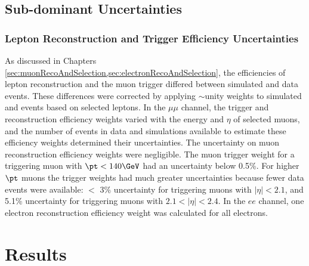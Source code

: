 \subsection{Sub-dominant Uncertainties}
\label{sec:subdominantUncs}

\subsubsection{Lepton Reconstruction and Trigger Efficiency Uncertainties}
\label{sec:leptonRecoTriggerEffUnc}
As discussed in Chapters \ref{sec:muonRecoAndSelection,sec:electronRecoAndSelection}, the efficiencies 
of lepton reconstruction and the muon trigger differed between simulated and data events.  These differences 
were corrected by applying $\sim$unity weights to simulated \DY and \WR events based on selected leptons.  
In the $\mu\mu$ channel, the trigger and reconstruction efficiency weights varied with the energy and $\eta$ of selected muons, and the 
number of events in data and simulations available to estimate these efficiency weights determined 
their uncertainties.  The uncertainty on muon reconstruction efficiency weights were negligible.  The muon trigger 
weight for a triggering muon with $\pt < 140\GeV$ had an uncertainty below 0.5\%.  For higher $\pt$ muons 
the trigger weights had much greater uncertainties because fewer data events were available: $<$ 3\% 
uncertainty for triggering muons with $|\eta| < 2.1$, and 5.1\% uncertainty for triggering muons with 
$2.1 < |\eta| < 2.4$.  In the $ee$ channel, one electron reconstruction efficiency weight was 
calculated for all electrons.


\section{Results}
\label{sec:searchResults}

%


